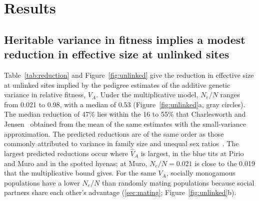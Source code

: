\documentclass{article}
\begin{document}
    \linenumbers
\fi

\section{Results}
\subsection{Heritable variance in fitness implies a modest reduction in effective size at unlinked sites}\label{sec:res_unlinked}
Table~\ref{tab:reduction} and Figure~\ref{fig:unlinked} give the reduction in effective size at unlinked sites implied by the pedigree estimates of the additive genetic variance in relative fitness, $V_A$. Under the multiplicative model, $N_e/N$ ranges from 0.021 to 0.98, with a median of 0.53 (Figure~\ref{fig:unlinked}a, gray circles). The median reduction of 47\% lies within the 16 to 55\% that Charlesworth and Jensen~\cite{charlesworth2022} obtained from the mean of the same estimates with the small-variance approximation. The predicted reductions are of the same order as those commonly attributed to variance in family size and unequal sex ratios~\cite{frankham1995}. The largest predicted reductions occur where $\hat{V}_A$ is largest, in the blue tits at Pirio and Muro and in the spotted hyenas; at Muro, $N_e/N = 0.021$ is close to the 0.019 that the multiplicative bound gives. For the same $V_A$, socially monogamous populations have a lower $N_e/N$ than randomly mating populations because social partners share each other's advantage (\autoref{sec:mating}; Figure~\ref{fig:unlinked}b).
\end{document}
